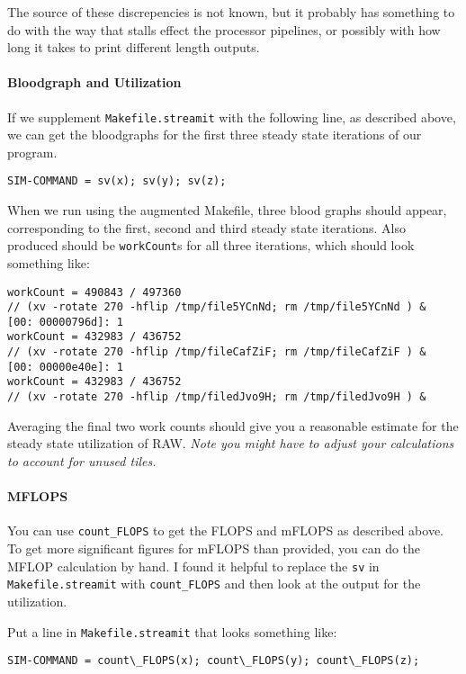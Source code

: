 The source of these discrepencies is not known, but it probably has something to do with
the way that stalls effect the processor pipelines, or possibly with how long it takes to
print different length outputs.

\paragraph{Bloodgraph and Utilization} 
If we supplement \texttt{Makefile.streamit} with the following line, as described above,
we can get the bloodgraphs for the first three steady state iterations of
our program.
\begin{verbatim}SIM-COMMAND = sv(x); sv(y); sv(z);\end{verbatim} 

When we run using the augmented Makefile, three blood graphs should appear, 
corresponding to the first, second and third steady state iterations.
Also produced should be \texttt{workCount}s for all three iterations, which
should look something like:
\begin{verbatim}
workCount = 490843 / 497360
// (xv -rotate 270 -hflip /tmp/file5YCnNd; rm /tmp/file5YCnNd ) &
[00: 00000796d]: 1
workCount = 432983 / 436752
// (xv -rotate 270 -hflip /tmp/fileCafZiF; rm /tmp/fileCafZiF ) &
[00: 00000e40e]: 1
workCount = 432983 / 436752
// (xv -rotate 270 -hflip /tmp/filedJvo9H; rm /tmp/filedJvo9H ) &
\end{verbatim} 

Averaging the final two work counts should give you a reasonable estimate for
the steady state utilization of RAW. \textit{Note you might have to adjust your calculations
to account for unused tiles.}

\paragraph{MFLOPS} 
You can use \texttt{count\_FLOPS} to get the FLOPS and mFLOPS as described above. To get more
significant figures for mFLOPS than provided, you can do the MFLOP calculation by hand. I found it
helpful to replace the \texttt{sv} in \texttt{Makefile.streamit} with \texttt{count\_FLOPS} and then look
at the output for the utilization.

Put a line in \texttt{Makefile.streamit} that looks something like:
\begin{verbatim}SIM-COMMAND = count\_FLOPS(x); count\_FLOPS(y); count\_FLOPS(z);\end{verbatim} 


